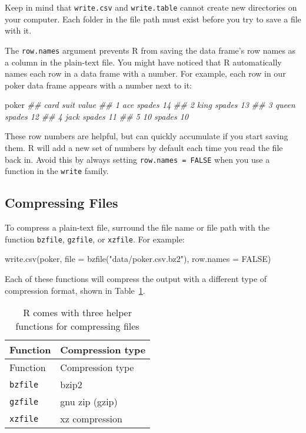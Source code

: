 \documentclass[
  letterpaper,
  DIV=11,
  numbers=noendperiod]{scrbook}
\newenvironment{Shaded}{\begin{snugshade}}{\end{snugshade}}
\newcommand{\AttributeTok}[1]{\textcolor[rgb]{0.40,0.45,0.13}{#1}}
\newcommand{\ConstantTok}[1]{\textcolor[rgb]{0.56,0.35,0.01}{#1}}
\newcommand{\DocumentationTok}[1]{\textcolor[rgb]{0.37,0.37,0.37}{\textit{#1}}}
\newcommand{\FunctionTok}[1]{\textcolor[rgb]{0.28,0.35,0.67}{#1}}
\newcommand{\NormalTok}[1]{\textcolor[rgb]{0.00,0.23,0.31}{#1}}
\newcommand{\StringTok}[1]{\textcolor[rgb]{0.13,0.47,0.30}{#1}}
\begin{document}
Keep in mind that \texttt{write.csv} and \texttt{write.table} cannot
create new directories on your computer. Each folder in the file path
must exist before you try to save a file with it.

The \texttt{row.names} argument prevents R from saving the data frame's
row names as a column in the plain-text file. You might have noticed
that R automatically names each row in a data frame with a number. For
example, each row in our poker data frame appears with a number next to
it:

\begin{Shaded}
\begin{Highlighting}[]
\NormalTok{poker}
\DocumentationTok{\#\#    card   suit value}
\DocumentationTok{\#\# 1   ace spades    14}
\DocumentationTok{\#\# 2  king spades    13}
\DocumentationTok{\#\# 3 queen spades    12}
\DocumentationTok{\#\# 4  jack spades    11}
\DocumentationTok{\#\# 5    10 spades    10}
\end{Highlighting}
\end{Shaded}

These row numbers are helpful, but can quickly accumulate if you start
saving them. R will add a new set of numbers by default each time you
read the file back in. Avoid this by always setting
\texttt{row.names\ =\ FALSE} when you use a function in the
\texttt{write} family.

\subsection{Compressing Files}\label{compressing-files}

To compress a plain-text file, surround the file name or file path with
the function \texttt{bzfile}, \texttt{gzfile}, or \texttt{xzfile}. For
example:

\begin{Shaded}
\begin{Highlighting}[]
\FunctionTok{write.csv}\NormalTok{(poker, }\AttributeTok{file =} \FunctionTok{bzfile}\NormalTok{(}\StringTok{"data/poker.csv.bz2"}\NormalTok{), }\AttributeTok{row.names =} \ConstantTok{FALSE}\NormalTok{)}
\end{Highlighting}
\end{Shaded}

Each of these functions will compress the output with a different type
of compression format, shown in Table~\ref{tbl-compression}.

\begin{longtable}[]{@{}ll@{}}
\caption{R comes with three helper functions for compressing
files}\label{tbl-compression}\tabularnewline
\toprule\noalign{}
Function & Compression type \\
\midrule\noalign{}
\endfirsthead
\toprule\noalign{}
Function & Compression type \\
\midrule\noalign{}
\endhead
\bottomrule\noalign{}
\endlastfoot
\texttt{bzfile} & bzip2 \\
\texttt{gzfile} & gnu zip (gzip) \\
\texttt{xzfile} & xz compression \\
\end{longtable}
\end{document}
